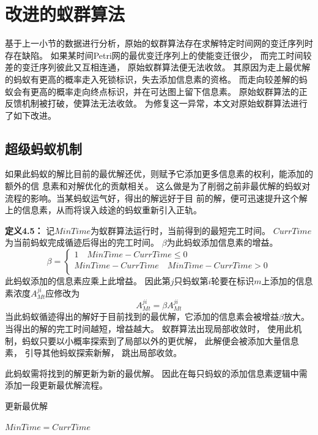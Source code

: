 \section{改进的蚁群算法}
基于上一小节的数据进行分析，原始的蚁群算法存在求解特定时间网的变迁序列时存在缺陷。
如果某时间Petri网的最优变迁序列上的使能变迁很少，
而完工时间较差的变迁序列彼此又互相连通，
原始蚁群算法便无法收敛。
其原因为走上最优解的蚂蚁有更高的概率走入死锁标识，失去添加信息素的资格。
而走向较差解的蚂蚁会有更高的概率走向终点标识，并在可达图上留下信息素。
原始蚁群算法的正反馈机制被打破，使算法无法收敛。
为修复这一异常，本文对原始蚁群算法进行了如下改进。
\subsection{超级蚂蚁机制}
如果此蚂蚁的解比目前的最优解还优，则赋予它添加更多信息素的权利，能添加的额外的信
息素和对解优化的贡献相关。
这么做是为了削弱之前非最优解的蚂蚁对流程的影响。当某蚂蚁运气好，得出的解远好于目
前的解，便可迅速提升这个解上的信息素，从而将误入歧途的蚂蚁重新引入正轨。

\textbf{定义4.5}\textbf{：}
记$MinTime$为蚁群算法运行时，当前得到的最短完工时间。
$CurrTime$为当前蚂蚁完成循迹后得出的完工时间。
$\beta$为此蚂蚁添加信息素的增益。
\begin{equation}
	\beta=\left\{
		\begin{aligned}
			1 \quad MinTime-CurrTime \leqslant 0\\
			MinTime-CurrTime \quad MinTime-CurrTime > 0\\
		\end{aligned}
		\right.
		\nonumber 
\end{equation}
此蚂蚁添加的信息素应乘上此增益。
因此第$j$只蚂蚁第$i$轮要在标识$m$上添加的信息素浓度$A_{Mt}^{ji}$应修改为
$$
A_{Mt}^{ji}=\beta A_{Mt}^{ji}
$$
当此蚂蚁循迹得出的解好于目前找到的最优解，它添加的信息素会被增益$\beta$放大。
当得出的解的完工时间越短，增益越大。
蚁群算法出现局部收敛时，
使用此机制，蚂蚁只要以小概率探索到了局部以外的更优解，
此解便会被添加大量信息素，
引导其他蚂蚁探索新解，
跳出局部收敛。

此蚂蚁需将找到的解更新为新的最优解。
因此在每只蚂蚁的添加信息素逻辑中需添加一段更新最优解流程。
\begin{algorithm}[H]
	\caption{更新最优解}
	\label{alg4-10}
	\begin{algorithmic}
			\State $MinTime=CurrTime$
			\EndIf
		\EndProcedure
	\end{algorithmic}
\end{algorithm}

